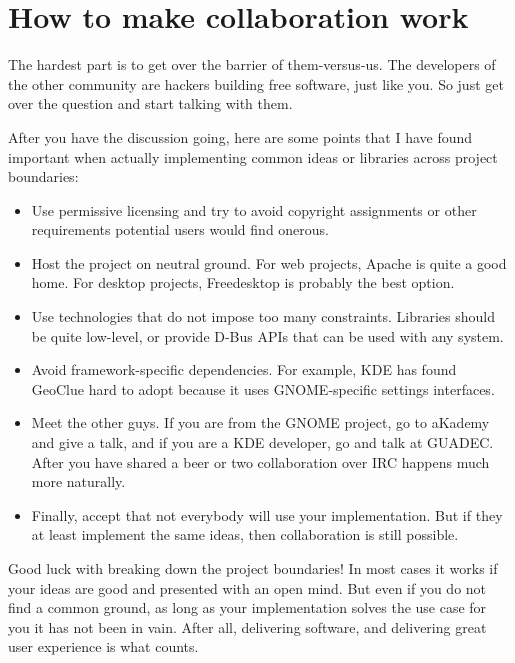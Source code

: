 \section*{How to make collaboration work}

The hardest part is to get over the barrier of them-versus-us. The developers of
the other community are hackers building free software, just like you. So just
get over the question and start talking with them.

After you have the discussion going, here are some points that I have found
important when actually implementing common ideas or libraries across project
boundaries:

\begin{itemize}
\item Use permissive licensing and try to avoid copyright assignments or other
requirements potential users would find onerous.
\item Host the project on neutral ground. For web projects, Apache is quite a
good home. For desktop projects, Freedesktop is probably the best option.
\item Use technologies that do not impose too many constraints. Libraries should
be quite low-level, or provide D-Bus APIs that can be used with any system.
\item Avoid framework-specific dependencies. For example, KDE has found GeoClue
hard to adopt because it uses GNOME-specific settings interfaces.
\item Meet the other guys. If you are from the GNOME project, go to aKademy and
give a talk, and if you are a KDE developer, go and talk at GUADEC. After you
have shared a beer or two collaboration over IRC happens much more naturally.
\item Finally, accept that not everybody will use your implementation. But if
they at least implement the same ideas, then collaboration is still possible.
\end{itemize}

Good luck with breaking down the project boundaries! In most cases it works if
your ideas are good and presented with an open mind.  But even if you do not
find a common ground, as long as your implementation solves the use case for you
it has not been in vain. After all, delivering software, and delivering great
user experience is what counts.

